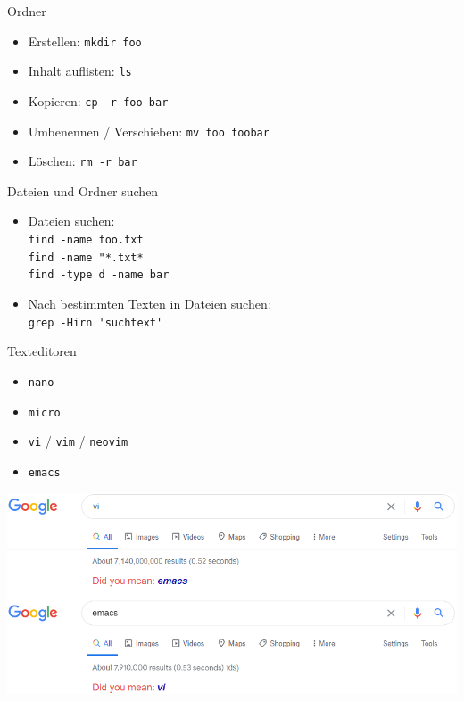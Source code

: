 \documentclass[compress]{beamer}
\begin{document}
\begin{frame}[fragile]{Ordner}
\begin{itemize}
\item Erstellen: \verb+mkdir foo+
\item Inhalt auflisten: \verb+ls+
\item Kopieren: \verb+cp -r foo bar+
\item Umbenennen / Verschieben: \verb+mv foo foobar+
\item Löschen: \verb+rm -r bar+
\end{itemize}
\end{frame}

\begin{frame}[fragile]{Dateien und Ordner suchen}
\begin{itemize}
\item Dateien suchen: \\
\verb+find -name foo.txt+ \\
\verb+find -name "*.txt*+ \\
\verb+find -type d -name bar+
\item Nach bestimmten Texten in Dateien suchen:\\
\verb+grep -Hirn 'suchtext'+
\end{itemize}
\end{frame}

\begin{frame}[fragile]{Texteditoren}
\begin{itemize}
\item \verb+nano+
\item \verb+micro+
\item \verb+vi+ / \verb+vim+ / \verb+neovim+
\item \verb+emacs+
\end{itemize}
\vspace{3mm}
\includegraphics[width=.9\textwidth]{emacsvi.png}
\end{frame}
\end{document}
